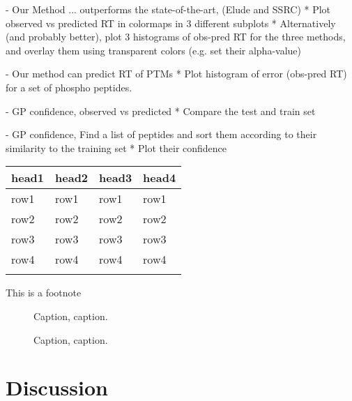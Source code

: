 \documentclass{bioinfo}
\begin{document}
\begin{methods}
- Our Method ... outperforms the state-of-the-art, (Elude and SSRC) 
* Plot observed vs predicted RT in colormaps in 3 different subplots
* Alternatively (and probably better), plot 3 histograms of obs-pred RT for the three methods, and overlay them using transparent colors (e.g. set their alpha-value)

- Our method can predict RT of PTMs
* Plot histogram of error (obs-pred RT) for a set of phospho peptides. 

- GP confidence, observed vs predicted
* Compare the test and train set

- GP confidence, Find a list of peptides and sort them according to their similarity to the training set
* Plot their confidence 



\begin{table}[!t]
{\begin{tabular}{llll}\toprule
head1 & head2 & head3 & head4\\\midrule
row1 & row1 & row1 & row1\\
row2 & row2 & row2 & row2\\
row3 & row3 & row3 & row3\\
row4 & row4 & row4 & row4\\\botrule
\end{tabular}}{This is a footnote}
\end{table}

\end{methods}

\begin{figure}[!tpb]%
\caption{Caption, caption.}\label{fig:01}
\end{figure}

\begin{figure}[!tpb]%
\caption{Caption, caption.}\label{fig:02}
\end{figure}

\section{Discussion}
\label{sec::dis}










%
%
\end{document}
